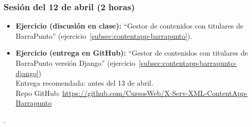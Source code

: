 \documentclass[a4paper,12pt]{article}
\begin{document}
\subsubsection{Sesión del 12 de abril (2 horas)}

\begin{itemize}
\item \textbf{Ejercicio (discusión en clase):} ``Gestor de contenidos con titulares de BarraPunto'' (ejercicio~\ref{subsec:contentapp-barrapunto}). 
\item \textbf{Ejercicio (entrega en GitHub):} ``Gestor de contenidos con titulares de BarraPunto versión Django'' (ejercicio~\ref{subsec:contentapp-barrapunto-django}) \\
  Entrega recomendada: antes del 13 de abril. \\
  Repo GitHub: \url{https://github.com/CursosWeb/X-Serv-XML-ContentApp-Barrapunto}
\end{itemize}


.
%
%
%
%
\end{document}
